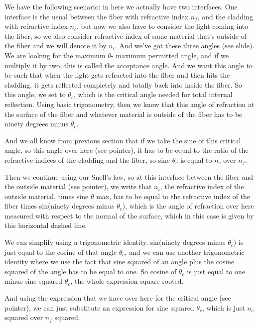 We have the following scenario: in here we actually have two interfaces. One interface is the usual between the fiber with refractive index $n_f$, and the cladding with refractive index $n_c$, but now we also have to consider the light coming into the fiber, so we also consider refractive index of some material that's outside of the fiber and we will denote it by $n_i$. And we've got these three angles (see slide). We are looking for the maximum $\theta$- maximum permitted angle, and if we multiply it by two, this is called the acceptance angle. And we want this angle to be such that when the light gets refracted into the fiber and then hits the cladding, it gets reflected completely and totally back into inside the fiber. So this angle, we set to $\theta_c$, which is the critical angle needed for total internal reflection. Using basic trigonometry, then we know that this angle of refraction at the surface of the fiber and whatever material is outside of the fiber has to be ninety degrees minus $\theta_c$.

And we all know from previous section that if we take the sine of this critical angle, so this angle over here (see pointer), it has to be equal to the ratio of the refractive indices of the cladding and the fiber, so sine $\theta_c$ is equal to $n_c$ over $n_f$.

Then we continue using our Snell's law, so at this interface between the fiber and the outside material (see pointer), we write that $n_i$, the refractive index of the outside material, times sine $\theta$ max, has to be equal to the refractive index of the fiber times sin(ninety degrees minus $\theta_c$), which is the angle of refraction over here measured with respect to the normal of the surface, which in this case is given by this horizontal dashed line.

We can simplify using a trigonometric identity.  sin(ninety degrees minus $\theta_c$) is just equal to the cosine of that angle $\theta_c$, and we can use another trigonometric identity where we use the fact that sine squared of an angle plus the cosine squared of the angle has to be equal to one. So cosine of $\theta_c$ is just equal to one minus sine squared $\theta_c$, the whole expression square rooted.

And using the expression that we have over here for the critical angle (see pointer), we can just substitute an expression for sine squared $\theta_c$, which is just $n_c$ squared over $n_f$ squared.


